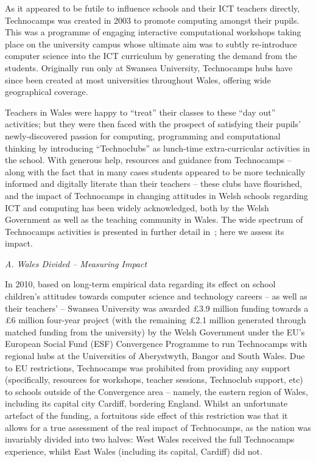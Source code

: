 \documentclass[conference]{IEEEtran}
\begin{document}
As it appeared to be futile to influence schools and their ICT
teachers directly, Technocamps was created in 2003 to promote
computing amongst their pupils.  This was a programme of engaging
interactive computational workshops taking place on the university
campus whose ultimate aim was to subtly re-introduce computer science
into the ICT curriculum by generating the demand from the students.
Originally run only at Swansea University, Technocamps hubs have since
been created at most universities throughout Wales, offering wide
geographical coverage.

Teachers in Wales were happy to ``treat'' their classes to these ``day
out'' activities; but they were then faced with the prospect of
satisfying their pupils' newly-discovered passion for computing,
programming and computational thinking by introducing ``Technoclubs''
as lunch-time extra-curricular activities in the school.  With
generous help, resources and guidance from Technocamps -- along with
the fact that in many cases students appeared to be more technically
informed and digitally literate than their
teachers -- these clubs have
flourished, and the impact of Technocamps in changing attitudes in
Welsh schools regarding ICT and computing has been widely
acknowledged, both by the Welsh Government
as well as the teaching community in Wales.
The wide spectrum of Technocamps activities is presented in further
detail in~\cite{crick+moller-wipsce2015}; here we assess its impact.

\noindent\textit{A. Wales Divided -- Measuring Impact}

In 2010, based on long-term empirical data regarding its effect on
school children's attitudes towards computer science and technology
careers -- as well as their teachers' -- Swansea University was
awarded \pounds 3.9 million funding towards a \pounds 6 million
four-year project (with the remaining \pounds 2.1 million generated
through matched funding from the university) by the Welsh Government
under the EU's European Social Fund (ESF) Convergence Programme to run
Technocamps with regional hubs at the Universities of Aberystwyth,
Bangor and South Wales.  Due to EU
restrictions, Technocamps was prohibited from providing any support
(specifically, resources for workshops, teacher sessions, Technoclub
support, etc) to schools outside of the Convergence area -- namely,
the eastern region of Wales, including its capital city Cardiff,
bordering England.  Whilst an unfortunate artefact of the funding, a
fortuitous side effect of this restriction was that it allows for a
true assessment of the real impact of Technocamps, as the nation was
invariably divided into two halves: West Wales received the full
Technocamps experience, whilst East Wales (including its capital,
Cardiff) did not.
\end{document}

